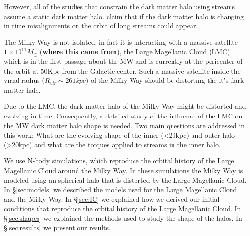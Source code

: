However, all of the studies that constrain the dark matter halo using streams
assume a static dark matter halo. \citep{Buist15} claim that if the dark matter
halo is changing in time misalignments on the orbit of long streams could appear.

The Milky Way is not isolated, in fact it is interacting with a
massive satellite ~$1\times10^{11}M_{\odot}$ (\textbf{where this came
from}), the Large Magellanic Cloud (LMC),
which is in the first passage about the MW and is currently at the pericenter
of the orbit at 50Kpc from the Galactic center. Such a massive satellite inside the virial
radius ($R_{vir}\sim 261kpc$) of the Milky Way should be distorting
the it's dark matter
halo. %

Due to the LMC, the dark matter halo of the Milky Way might be
distorted and evolving in time. Consequently, a detailed study of the
influence of the LMC on the MW dark matter halo shape is needed. Two
main questions are addressed in this work: What are the evolving shape of the inner
(<20kpc) and outer halo (>20kpc) and what are the torques applied
to streams in the inner halo.

We use N-body simulations, which reproduce the orbital history of the
Large Magellanic Cloud around the Milky Way. In these simulations the Milky Way is modeled
using an spherical halo that is distorted by the Large Magellanic
Cloud.
In \S\ref{sec:models} we described the models used for the Large
Magellanic Cloud and
the Milky Way. In \S\ref{sec:IC} we explained how we derived our initial
conditions that reproduce the orbital history of the Large Magellanic
Cloud. In \S\ref{sec:shapes} we explained the methods used to study
the shape of the halos. In \S\ref{sec:results} we present our
results.
